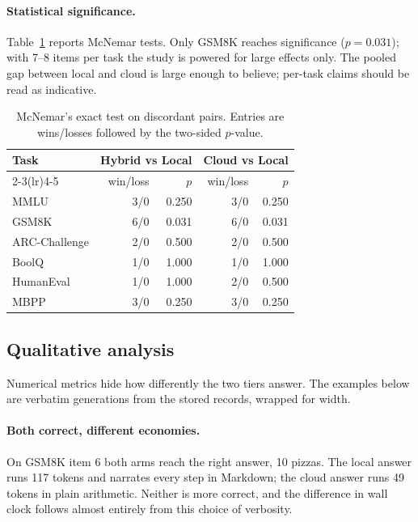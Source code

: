\documentclass[11pt,a4paper]{article}
\begin{document}
\paragraph{Statistical significance.}
Table~\ref{tab:significance} reports McNemar tests. Only GSM8K reaches
significance ($p=0.031$); with 7--8 items per task the study is powered for
large effects only. The pooled gap between local and cloud is large enough to
believe; per-task claims should be read as indicative.

\begin{table}[!htbp]
\centering
\small
\caption{McNemar's exact test on discordant pairs. Entries are
wins/losses followed by the two-sided $p$-value.}
\label{tab:significance}
\begin{tabular}{@{}lrrrr@{}}
\toprule
Task & \multicolumn{2}{c}{Hybrid vs Local} & \multicolumn{2}{c}{Cloud vs Local} \\
\cmidrule(lr){2-3}\cmidrule(lr){4-5}
 & win/loss & $p$ & win/loss & $p$ \\
\midrule
MMLU & 3/0 & 0.250 & 3/0 & 0.250 \\
GSM8K & 6/0 & 0.031 & 6/0 & 0.031 \\
ARC-Challenge & 2/0 & 0.500 & 2/0 & 0.500 \\
BoolQ & 1/0 & 1.000 & 1/0 & 1.000 \\
HumanEval & 1/0 & 1.000 & 2/0 & 0.500 \\
MBPP & 3/0 & 0.250 & 3/0 & 0.250 \\
\bottomrule
\end{tabular}
\end{table}

\subsection{Qualitative analysis}
Numerical metrics hide how differently the two tiers answer. The examples below
are verbatim generations from the stored records, wrapped for width.

\paragraph{Both correct, different economies.}
On GSM8K item 6 both arms reach the right answer, 10 pizzas. The local answer
runs 117 tokens and narrates every step in Markdown; the cloud
answer runs 49 tokens in plain arithmetic. Neither is more
correct, and the difference in wall clock follows almost entirely from this
choice of verbosity.
\end{document}
